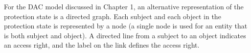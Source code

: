 \documentclass[a4paper]{exam}
\begin{document}
    \pagebreak
    \begin{questions}
        \question[5 $\times$ 2 = 10]
        For the DAC model discussed in Chapter 1, an alternative representation of the protection state is a directed graph. Each subject and each object in the protection state is represented by a node (a single node is used for an entity that is both subject and object). A directed line from a subject to an object indicates an access right, and the label on the link defines the access right.
\end{questions}
\end{document}
